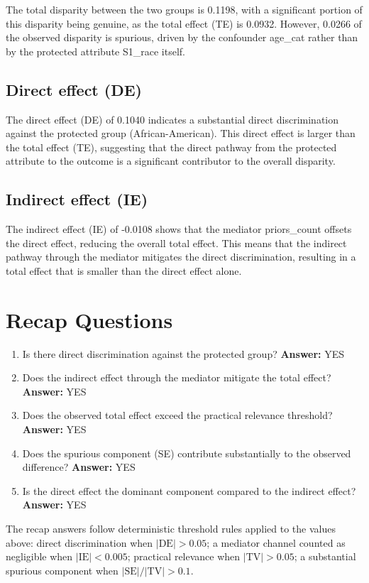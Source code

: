 \documentclass[11pt]{article}
\begin{document}
The total disparity between the two groups is 0.1198, with a significant portion of this disparity being genuine, as the total effect (TE) is 0.0932. However, 0.0266 of the observed disparity is spurious, driven by the confounder age\_cat rather than by the protected attribute S1\_race itself.

\subsection{Direct effect (DE)}

The direct effect (DE) of 0.1040 indicates a substantial direct discrimination against the protected group (African-American). This direct effect is larger than the total effect (TE), suggesting that the direct pathway from the protected attribute to the outcome is a significant contributor to the overall disparity.

\subsection{Indirect effect (IE)}

The indirect effect (IE) of -0.0108 shows that the mediator priors\_count offsets the direct effect, reducing the overall total effect. This means that the indirect pathway through the mediator mitigates the direct discrimination, resulting in a total effect that is smaller than the direct effect alone.

\section{Recap Questions}

\begin{enumerate}
\item Is there direct discrimination against the protected group? \textbf{Answer:} YES
\item Does the indirect effect through the mediator mitigate the total effect? \textbf{Answer:} YES
\item Does the observed total effect exceed the practical relevance threshold? \textbf{Answer:} YES
\item Does the spurious component (SE) contribute substantially to the observed difference? \textbf{Answer:} YES
\item Is the direct effect the dominant component compared to the indirect effect? \textbf{Answer:} YES
\end{enumerate}

\vspace{1em}
\noindent\footnotesize
The recap answers follow deterministic threshold rules applied to the values above: direct discrimination when $|\mathrm{DE}| > 0.05$; a mediator channel counted as negligible when $|\mathrm{IE}| < 0.005$; practical relevance when $|\mathrm{TV}| > 0.05$; a substantial spurious component when $|\mathrm{SE}| / |\mathrm{TV}| > 0.1$.
\end{document}
